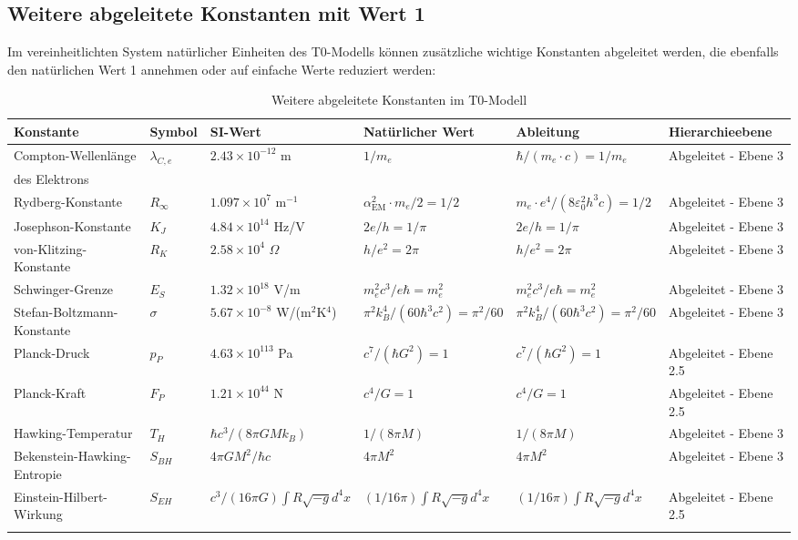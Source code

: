 \documentclass[12pt,a4paper]{article}
\newcommand{\alphaEM}{\alpha_{\text{EM}}}
\begin{document}
	\subsection{Weitere abgeleitete Konstanten mit Wert 1}
	
	Im vereinheitlichten System natürlicher Einheiten des T0-Modells können zusätzliche wichtige Konstanten abgeleitet werden, die ebenfalls den natürlichen Wert 1 annehmen oder auf einfache Werte reduziert werden:
	
	\begin{table}[ht]
		\centering
		\begin{adjustbox}{scale=0.65}
			\begin{tabular}{llllll}
				\hline
				\textbf{Konstante} & \textbf{Symbol} & \textbf{SI-Wert} & \textbf{Natürlicher Wert} & \textbf{Ableitung} & \textbf{Hierarchieebene} \\
				\hline
				Compton-Wellenlänge & $\lambda_{C,e}$ & $2.43 \times 10^{-12}$ m & $1/m_e$ & $\hbar/(m_e\cdot c) = 1/m_e$ & Abgeleitet - Ebene 3 \\
				des Elektrons & & & & & \\
				Rydberg-Konstante & $R_\infty$ & $1.097 \times 10^7$ m$^{-1}$ & $\alphaEM^2\cdot m_e/2 = 1/2$ & $m_e\cdot e^4/(8\varepsilon_0^2h^3c) = 1/2$ & Abgeleitet - Ebene 3 \\
				Josephson-Konstante & $K_J$ & $4.84 \times 10^{14}$ Hz/V & $2e/h = 1/\pi$ & $2e/h = 1/\pi$ & Abgeleitet - Ebene 3 \\
				von-Klitzing-Konstante & $R_K$ & $2.58 \times 10^4$ $\Omega$ & $h/e^2 = 2\pi$ & $h/e^2 = 2\pi$ & Abgeleitet - Ebene 3 \\
				Schwinger-Grenze & $E_S$ & $1.32 \times 10^{18}$ V/m & $m_e^2c^3/e\hbar = m_e^2$ & $m_e^2c^3/e\hbar = m_e^2$ & Abgeleitet - Ebene 3 \\
				Stefan-Boltzmann-Konstante & $\sigma$ & $5.67 \times 10^{-8}$ W/(m$^2$K$^4$) & $\pi^2k_B^4/(60\hbar^3c^2) = \pi^2/60$ & $\pi^2k_B^4/(60\hbar^3c^2) = \pi^2/60$ & Abgeleitet - Ebene 3 \\
				Planck-Druck & $p_P$ & $4.63 \times 10^{113}$ Pa & $c^7/(\hbar G^2) = 1$ & $c^7/(\hbar G^2) = 1$ & Abgeleitet - Ebene 2.5 \\
				Planck-Kraft & $F_P$ & $1.21 \times 10^{44}$ N & $c^4/G = 1$ & $c^4/G = 1$ & Abgeleitet - Ebene 2.5 \\
				Hawking-Temperatur & $T_H$ & $\hbar c^3/(8\pi GMk_B)$ & $1/(8\pi M)$ & $1/(8\pi M)$ & Abgeleitet - Ebene 3 \\
				Bekenstein-Hawking-Entropie & $S_{BH}$ & $4\pi GM^2/\hbar c$ & $4\pi M^2$ & $4\pi M^2$ & Abgeleitet - Ebene 3 \\
				Einstein-Hilbert-Wirkung & $S_{EH}$ & $c^3/(16\pi G)\int R\sqrt{-g} d^4x$ & $(1/16\pi)\int R\sqrt{-g} d^4x$ & $(1/16\pi)\int R\sqrt{-g} d^4x$ & Abgeleitet - Ebene 2.5 \\
				\hline
				\multicolumn{5}{c}{} \\
				\hline
			\end{tabular}
		\end{adjustbox}
		\caption{Weitere abgeleitete Konstanten im T0-Modell}
		\label{tab:derived_const}
	\end{table}
	
\end{document}
